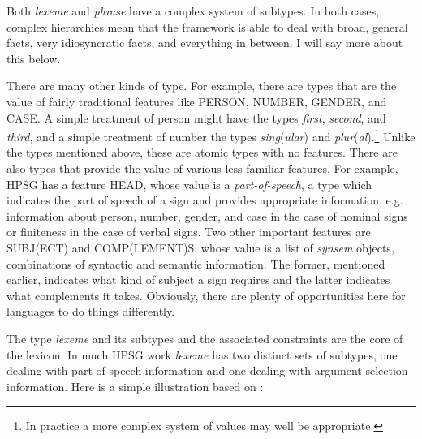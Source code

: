 \documentclass[output=paper]{langsci/langscibook}
\begin{document}
\ea\label{ex-5:key:1}
\z
%
Both \emph{lexeme}   and \emph{phrase} have a complex system of subtypes.
In both cases, complex hierarchies mean that the framework is able to deal with
broad, general facts, very idiosyncratic facts, and everything in between. I
will say more about this below.

There are many other kinds of type. For example, there are types that are the
value of fairly traditional features like PERSON, NUMBER, GENDER, and CASE. A
simple treatment of person might have the types \emph{first},
\emph{second}, and \emph{third}, and a simple treatment of number the types
\emph{sing}(\emph{ular}) and \emph{plur}(\emph{al}).\footnote{
\textrm{In practice a more complex system of values may well be appropriate.}}
Unlike the types mentioned above, these are atomic types with no features.
There are also types that provide the value of various less familiar features.
For example, \gls{HPSG} has a feature HEAD, whose value is a \emph{part-of-speech},
a type which indicates the part of speech of a sign and provides appropriate
information, e.g. information about person, number, gender, and case in the
case of nominal signs or finiteness in the case of verbal signs. Two other
important features are SUBJ(ECT) and COMP(LEMENT)S, whose value is a list of
\emph{synsem} objects, combinations of syntactic and semantic information.
The former, mentioned earlier, indicates what kind of subject a sign requires
and the latter indicates what complements it takes. Obviously, there are plenty
of opportunities here for languages to do things differently.

The type \emph{lexeme} and its subtypes and the associated constraints are the
core of the lexicon. In much \gls{HPSG} work \emph{lexeme} has two distinct
sets of subtypes, one dealing with part-of-speech information and one dealing
with argument selection information. Here is a simple illustration based on
\citet[20]{GinSag2000}:
\end{document}
